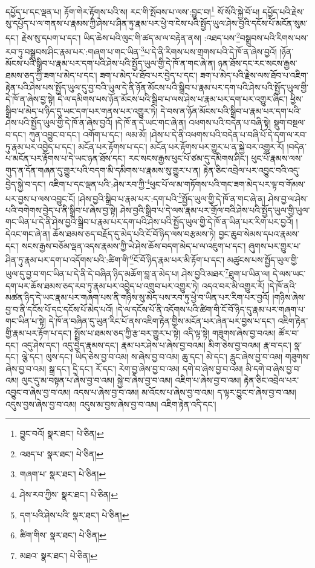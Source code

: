 དཔྱོད་པ་དང་ལྡན་པ། རྟོག་གེར་རྟོགས་པའི་ས། རང་གི་སྤོབས་པ་ལས་:བྱུང་བ།\footnote{བྱུང་བའོ།  སྣར་ཐང་།  པེ་ཅིན། } སོ་སོའི་སྐྱེ་བོ་པ། དཔྱོད་པའི་རྗེས་སུ་དཔྱོད་པ་ལ་གནས་པ་རྣམས་ཀྱི་ཤེས་པ་ཤིན་ཏུ་རྣམ་པར་ཕྱེ་བ་ངེས་པའི་སྤྱོད་ཡུལ་ཤེས་བྱའི་དངོས་པོ་མངོན་སུམ་དང་། རྗེས་སུ་དཔག་པ་དང་། ཡིད་ཆེས་པའི་ལུང་གི་ཚད་མ་ལ་བརྟེན་ནས། :འཐད་པས་\footnote{འཐད་པ་  སྣར་ཐང་།  པེ་ཅིན། }བསྒྲུབས་པའི་རིགས་པས་རབ་ཏུ་བསྒྲུབས་ཤིང་རྣམ་པར་:གཞག་པ་གང་ཡིན་\footnote{གཞག་པ་  སྣར་ཐང་།  པེ་ཅིན། }པ་དེ་ནི་རིགས་པས་གྲགས་པའི་དེ་ཁོ་ན་ཞེས་བྱའོ། །ཉོན་མོངས་པའི་སྒྲིབ་པ་རྣམ་པར་དག་པའི་ཤེས་པའི་སྤྱོད་ཡུལ་གྱི་དེ་ཁོ་ན་གང་ཞེ་ན། ཉན་ཐོས་དང་རང་སངས་རྒྱས་ཐམས་ཅད་ཀྱི་ཟག་པ་མེད་པ་དང་། ཟག་པ་མེད་པ་ཐོབ་པར་བྱེད་པ་དང་། ཟག་པ་མེད་པའི་རྗེས་ལས་ཐོབ་པ་འཇིག་རྟེན་པའི་ཤེས་པས་སྤྱོད་ཡུལ་དུ་བྱ་བའི་ཡུལ་དེ་ནི་ཉོན་མོངས་པའི་སྒྲིབ་པ་རྣམ་པར་དག་པའི་ཤེས་པའི་སྤྱོད་ཡུལ་གྱི་དེ་ཁོ་ན་ཞེས་བྱ་སྟེ། དེ་ལ་དམིགས་པས་ཉོན་མོངས་པའི་སྒྲིབ་པ་ལས་ཤེས་པ་རྣམ་པར་དག་པར་འགྱུར་ཞིང་། ཕྱིས་སྒྲིབ་པ་མེད་པ་ཉིད་དུ་ཡང་དག་པར་གནས་པར་འགྱུར་ཏེ། དེ་བས་ན་ཉོན་མོངས་པའི་སྒྲིབ་པ་རྣམ་པར་དག་པའི་ཤེས་པའི་སྤྱོད་ཡུལ་གྱི་དེ་ཁོ་ན་ཞེས་བྱའོ། །དེ་ཁོ་ན་དེ་ཡང་གང་ཞེ་ན། འཕགས་པའི་བདེན་པ་བཞི་སྟེ། སྡུག་བསྔལ་བ་དང་། ཀུན་འབྱུང་བ་དང་། འགོག་པ་དང་། ལམ་མོ། །ཤེས་པ་དེ་ནི་འཕགས་པའི་བདེན་པ་བཞི་པོ་དེ་དག་ལ་རབ་ཏུ་རྣམ་པར་འབྱེད་པ་དང་། མངོན་པར་རྟོགས་པ་དང་། མངོན་པར་རྟོགས་པར་གྱུར་པ་ན་སྐྱེ་བར་འགྱུར་རོ། །བདེན་པ་མངོན་པར་རྟོགས་པ་དེ་ཡང་ཉན་ཐོས་དང་། རང་སངས་རྒྱས་ཕུང་པོ་ཙམ་དུ་དམིགས་ཤིང་། ཕུང་པོ་རྣམས་ལས་གུད་ན་དོན་གཞན་དུ་གྱུར་པའི་བདག་མི་དམིགས་པ་རྣམས་སུ་གྱུར་པ་ན། རྟེན་ཅིང་འབྲེལ་པར་འབྱུང་བའི་འདུ་བྱེད་སྐྱེ་བ་དང་། འཇིག་པ་དང་ལྡན་པའི་:ཤེས་རབ་ཀྱི་\footnote{ཤེས་རབ་ཀྱིས་  སྣར་ཐང་།  པེ་ཅིན། }ཕུང་པོ་ལ་མ་གཏོགས་པའི་གང་ཟག་མེད་པར་ལྟ་བ་གོམས་པར་བྱས་པ་ལས་འབྱུང་ངོ། །ཤེས་བྱའི་སྒྲིབ་པ་རྣམ་པར་:དག་པའི་\footnote{དག་པའི་ཤེས་པའི་  སྣར་ཐང་།  པེ་ཅིན། }སྤྱོད་ཡུལ་གྱི་དེ་ཁོ་ན་གང་ཞེ་ན། ཤེས་བྱ་ལ་ཤེས་པའི་བགེགས་བྱེད་པ་ནི་སྒྲིབ་པ་ཞེས་བྱ་སྟེ། ཤེས་བྱའི་སྒྲིབ་པ་དེ་ལས་རྣམ་པར་གྲོལ་བའི་ཤེས་པའི་སྤྱོད་ཡུལ་གྱི་ཡུལ་གང་ཡིན་པ་དེ་ནི་ཤེས་བྱའི་སྒྲིབ་པ་རྣམ་པར་དག་པའི་ཤེས་པའི་སྤྱོད་ཡུལ་གྱི་དེ་ཁོ་ན་ཡིན་པར་རིག་པར་བྱའོ། །དེའང་གང་ཞེ་ན། ཆོས་ཐམས་ཅད་བརྗོད་དུ་མེད་པའི་ངོ་བོ་ཉིད་ལས་བརྩམས་ཏེ། བྱང་ཆུབ་སེམས་དཔའ་རྣམས་དང་། སངས་རྒྱས་བཅོམ་ལྡན་འདས་རྣམས་ཀྱི་ཡེ་ཤེས་ཆོས་བདག་མེད་པ་ལ་འཇུག་པ་དང་། ཞུགས་པར་གྱུར་པ་ཤིན་ཏུ་རྣམ་པར་དག་པ་འདོགས་པའི་:ཚིག་གི་\footnote{ཚིག་གིས་  སྣར་ཐང་།  པེ་ཅིན། }ངོ་བོ་ཉིད་རྣམ་པར་མི་རྟོག་པ་དང་། མཚུངས་པས་སྤྱོད་ཡུལ་གྱི་ཡུལ་དུ་བྱ་བ་གང་ཡིན་པ་དེ་ནི་དེ་བཞིན་ཉིད་མཆོག་བླ་ན་མེད་པ། ཤེས་བྱའི་མཐར་\footnote{མཐའ་  སྣར་ཐང་།  པེ་ཅིན། }ཐུག་པ་ཡིན་ལ། དེ་ལས་ཡང་དག་པར་ཆོས་ཐམས་ཅད་རབ་ཏུ་རྣམ་པར་འབྱེད་པ་འགྲུབ་པར་འགྱུར་ཏེ། འདའ་བར་མི་འགྱུར་རོ། །དེ་ཁོ་ནའི་མཚན་ཉིད་དེ་ཡང་རྣམ་པར་གཞག་པས་ནི་གཉིས་སུ་མེད་པས་རབ་ཏུ་ཕྱེ་བ་ཡིན་པར་རིག་པར་བྱའོ། །གཉིས་ཞེས་བྱ་བ་ནི་དངོས་པོ་དང་དངོས་པོ་མེད་པའོ། །དེ་ལ་དངོས་པོ་ནི་འདོགས་པའི་ཚིག་གི་ངོ་བོ་ཉིད་དུ་རྣམ་པར་གཞག་པ་གང་ཡིན་པ་སྟེ། དེ་ཁོ་ན་བཞིན་དུ་ཡུན་རིང་པོ་ནས་འཇིག་རྟེན་གྱིས་མངོན་པར་ཞེན་པར་བྱས་པ་དང་། འཇིག་རྟེན་གྱི་རྣམ་པར་རྟོག་པ་དང་། སྤྲོས་པ་ཐམས་ཅད་ཀྱི་རྩ་བར་གྱུར་པ་སྟེ། འདི་ལྟ་སྟེ། གཟུགས་ཞེས་བྱ་བའམ། ཚོར་བ་དང་། འདུ་ཤེས་དང་། འདུ་བྱེད་རྣམས་དང་། རྣམ་པར་ཤེས་པ་ཞེས་བྱ་བའམ། མིག་ཅེས་བྱ་བའམ། རྣ་བ་དང་། སྣ་དང་། ལྕེ་དང་། ལུས་དང་། ཡིད་ཅེས་བྱ་བ་འམ། ས་ཞེས་བྱ་བ་འམ། ཆུ་དང་། མེ་དང་། རླུང་ཞེས་བྱ་བ་འམ། གཟུགས་ཞེས་བྱ་བ་འམ། སྒྲ་དང་། དྲི་དང་། རོ་དང་། རེག་བྱ་ཞེས་བྱ་བ་འམ། དགེ་བ་ཞེས་བྱ་བ་འམ། མི་དགེ་བ་ཞེས་བྱ་བ་འམ། ལུང་དུ་མ་བསྟན་པ་ཞེས་བྱ་བ་འམ། སྐྱེ་བ་ཞེས་བྱ་བ་འམ། འཇིག་པ་ཞེས་བྱ་བ་འམ། རྟེན་ཅིང་འབྲེལ་པར་འབྱུང་བ་ཞེས་བྱ་བ་འམ། འདས་པ་ཞེས་བྱ་བ་འམ། མ་འོངས་པ་ཞེས་བྱ་བ་འམ། ད་ལྟར་བྱུང་བ་ཞེས་བྱ་བ་འམ། འདུས་བྱས་ཞེས་བྱ་བ་འམ། འདུས་མ་བྱས་ཞེས་བྱ་བ་འམ། འཇིག་རྟེན་འདི་དང་། 